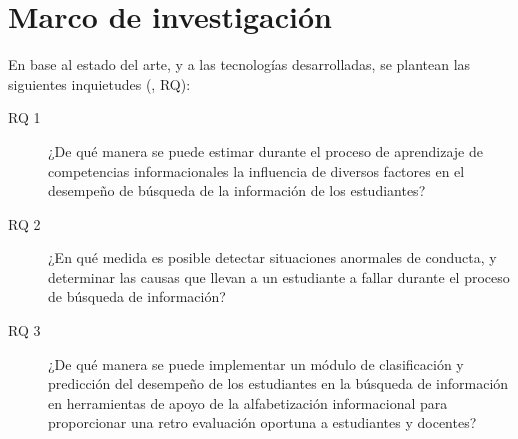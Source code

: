 \section{Marco de investigación}
\label{sec:marco_investigacion}
En base al estado del arte, y a las tecnologías desarrolladas, se plantean las siguientes inquietudes (, RQ):

\begin{description}
	\item [RQ 1] ¿De qué manera se puede estimar durante el proceso de aprendizaje de competencias informacionales la influencia de diversos factores en el desempeño de búsqueda de la información de los estudiantes?
	\item [RQ 2] ¿En qué medida es posible detectar situaciones anormales de conducta, y determinar las causas que llevan a un estudiante a fallar durante el proceso de búsqueda de información? 
	\item [RQ 3] ¿De qué manera se puede implementar un módulo de clasificación y predicción del desempeño de los estudiantes en la búsqueda de información en herramientas de apoyo de la alfabetización informacional para proporcionar una retro evaluación oportuna a estudiantes y docentes?
\end{description}